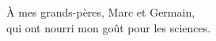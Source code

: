 
\begin{dedication}

    À mes grands-pères, Marc et Germain,\\ qui ont nourri mon goût pour les sciences.

\end{dedication}